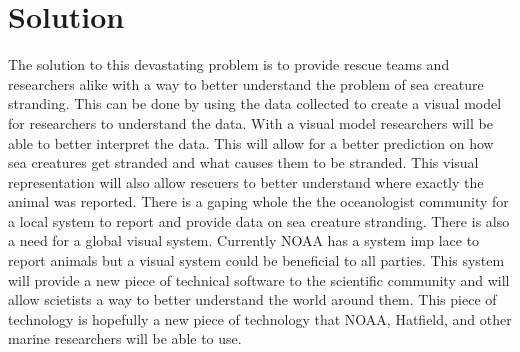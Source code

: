 \documentclass[onecolumn, draftclsnofoot,10pt, compsoc]{IEEEtran}
\begin{document}
  \section{Solution}
      The solution to this devastating problem is to provide rescue teams and researchers alike with a way to better understand the problem of sea creature stranding. This can be done by using the data collected to create a visual model for researchers to understand the data. With a visual model researchers will be able to better interpret the data. This will allow for a better prediction on how sea creatures get stranded and what causes them to be stranded. This visual representation will also allow rescuers to better understand where exactly the animal was reported. There is a gaping whole the the oceanologist community for a local system to report and provide data on sea creature stranding. There is also a need for a global visual system. Currently NOAA has a system imp lace to report animals but a visual system could be beneficial to all parties. This system will provide a new piece of technical software to the scientific community and will allow scietists a way to better understand the world around them. This piece of technology is hopefully a new piece of technology that NOAA, Hatfield, and other marine researchers will be able to use.
      
\end{document}
